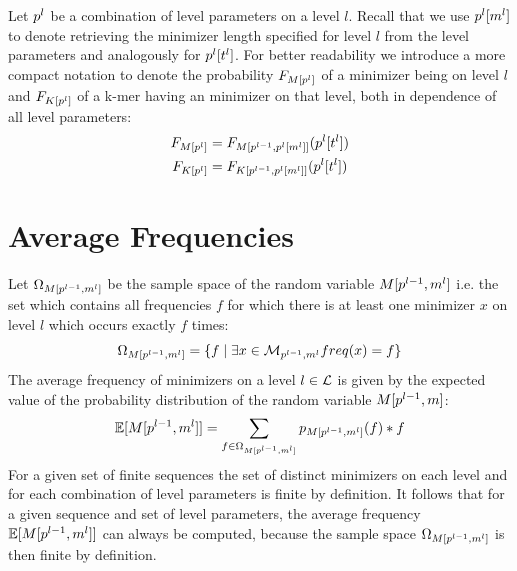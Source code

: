 \documentclass[a4paper,titlepage,onecolumn,oneside,12pt,nenglish,titlepage=firstiscover]{scrbook}
\theoremstyle{plain} %
\theoremstyle{definition} %
\theoremstyle{remark} %
\theoremstyle{plain}
\newcommand{\minimizerLength}{m}
\newcommand{\threshold}{t}
\newcommand{\level}{l}
\newcommand{\minimizer}{x}
\begin{document}
Let $\levelParameters{\level}$ be a combination of level parameters on a level $\level$. Recall that we use $\parameterAccess{\level}{\minimizerLength}{\level}$ to denote retrieving the minimizer length specified for level $\level$ from the level parameters and analogously for $\parameterAccess{\level}{\threshold}{\level}$. For better readability we introduce a more compact notation to denote the probability $\CDF{\compactZV{M}{\levelParameters{\level}}}$ of a minimizer being \infrequent on level $\level$ and $\CDF{\compactZV{K}{\levelParameters{\level}}}$ of a k-mer having an \infrequent minimizer on that level, both in dependence of all level parameters:
\begin{align}
	\CDF{\compactZV{M}{\levelParameters{\level}}} &= \CDF{\manualZV{M}{\levelParameters{\level-1}}{\parameterAccess{\level}{\minimizerLength}{\level}}}(\parameterAccess{\level}{\threshold}{\level})\\
	\CDF{\compactZV{K}{\levelParameters{\level}}} &= \CDF{\manualZV{K}{\levelParameters{\level-1}}{\parameterAccess{\level}{\minimizerLength}{\level}}}(\parameterAccess{\level}{\threshold}{\level})
\end{align}

\section{Average Frequencies} \label{sec:averagefrequencies}
Let $\Omega_{\manualZV{M}{\levelParameters{\level-1}}{\minimizerLength^\level}}$ be the sample space of the random variable $\manualZV{M}{\levelParameters{\level-1}}{\minimizerLength^\level}$ i.e. the set which contains all frequencies $f$ for which there is at least one minimizer $\minimizer$ on level $\level$ which occurs exactly $f$ times:
\begin{equation}
	\Omega_{\manualZV{M}{\levelParameters{\level-1}}{\minimizerLength^\level}} = \{f \mid \exists \minimizer \in \distinctMinimizers{\level} \frequencyOf{\minimizer} = f \}
\end{equation}
The average frequency of minimizers on a level $\level \in \setOfLevels$ is given by the expected value of the probability distribution of the random variable $\manualZV{M}{\levelParameters{\level-1}}{m}$:
\begin{equation}
	\mathbb{E}[\manualZV{M}{\levelParameters{\level-1}}{\minimizerLength^\level}] = \sum_{f \in \Omega_{\manualZV{M}{\levelParameters{\level-1}}{\minimizerLength^\level}}} \probabilityDistribution{\manualZV{M}{\levelParameters{\level-1}}{\minimizerLength^\level}}(f) * f
\end{equation}
For a given set of finite sequences the set of distinct minimizers on each level and for each combination of level parameters is finite by definition. It follows that for a given sequence and set of level parameters, the average frequency $\mathbb{E}[\manualZV{M}{\levelParameters{\level-1}}{\minimizerLength^\level}]$ can always be computed, because the sample space $\Omega_{\manualZV{M}{\levelParameters{\level-1}}{\minimizerLength^\level}}$ is then finite by definition.
\end{document}
